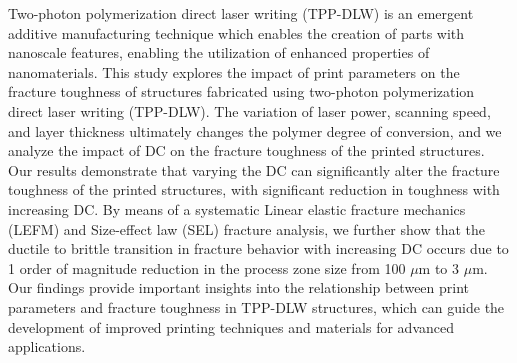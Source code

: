 Two-photon polymerization direct laser writing (TPP-DLW) is an emergent additive manufacturing technique which enables the creation of parts with nanoscale features, enabling the utilization of enhanced properties of nanomaterials.
This study explores the impact of print parameters on the fracture toughness of structures fabricated using two-photon polymerization direct laser writing (TPP-DLW). 
The variation of laser power, scanning speed, and layer thickness ultimately changes the polymer degree of conversion, and we analyze the impact of DC on the fracture toughness of the printed structures. 
Our results demonstrate that varying the DC can significantly alter the fracture toughness of the printed structures, with significant reduction in toughness with increasing DC.
By means of a systematic Linear elastic fracture mechanics (LEFM) and Size-effect law (SEL) fracture analysis, we further show that the ductile to brittle transition in fracture behavior with increasing DC occurs due to 1 order of magnitude reduction in the process zone size from 100 $\mu$m  to 3 $\mu$m.
Our findings provide important insights into the relationship between print parameters and fracture toughness in TPP-DLW structures, which can guide the development of improved printing techniques and materials for advanced applications.